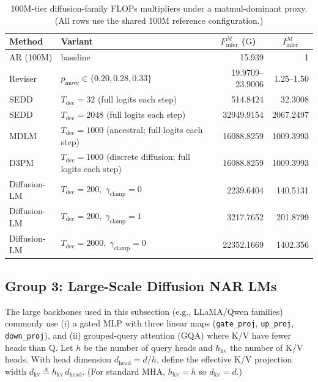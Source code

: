 \documentclass[11pt]{article}
\newcommand{\G}{\mathrm{G}} %
\begin{document}
\begin{table}[t]
\centering
\small
\setlength{\tabcolsep}{4pt}
\begin{tabular}{llrr}
\toprule
Method & Variant
& \multicolumn{1}{c}{$F_{\text{infer}}^{\mathcal{M}}$ ($\G$)}
& \multicolumn{1}{c}{$I_{\text{infer}}^{\mathcal{M}}$} \\
\midrule
AR (100M) & baseline
& \num{15.939} & 1 \\
\midrule
Reviser & $p_{\text{move}}\in\{0.20,0.28,0.33\}$
& \num{19.9709}--\num{23.9006} & \num{1.25}--\num{1.50} \\
\midrule
SEDD & $T_{\text{dec}}{=}32$ (full logits each step)
& \num{514.8424} & \num{32.3008} \\
SEDD & $T_{\text{dec}}{=}2048$ (full logits each step)
& \num{32949.9154} & \num{2067.2497} \\
\midrule
MDLM & $T_{\text{dec}}{=}1000$ (ancestral; full logits each step)
& \num{16088.8259} & \num{1009.3993} \\
\midrule
D3PM & $T_{\text{dec}}{=}1000$ (discrete diffusion; full logits each step)
& \num{16088.8259} & \num{1009.3993} \\
\midrule
Diffusion-LM & $T_{\text{dec}}{=}200,\;\gamma_{\text{clamp}}{=}0$
& \num{2239.6404} & \num{140.5131} \\
Diffusion-LM & $T_{\text{dec}}{=}200,\;\gamma_{\text{clamp}}{=}1$
& \num{3217.7652} & \num{201.8799} \\
Diffusion-LM & $T_{\text{dec}}{=}2000,\;\gamma_{\text{clamp}}{=}0$
& \num{22352.1669} & \num{1402.356} \\
\bottomrule
\end{tabular}
\caption{100M-tier diffusion-family FLOPs multipliers under a matmul-dominant proxy.
(All rows use the shared 100M reference configuration.)}
\end{table}

\subsection{Group 3: Large-Scale Diffusion NAR LMs}


The large backbones used in this subsection (e.g., LLaMA/Qwen families) commonly use
(i) a gated MLP with three linear maps (\texttt{gate\_proj}, \texttt{up\_proj}, \texttt{down\_proj}),
and (ii) grouped-query attention (GQA) where K/V have fewer heads than Q.
Let $h$ be the number of query heads and $h_{\text{kv}}$ the number of K/V heads.
With head dimension $d_{\text{head}}=d/h$, define the effective K/V projection width
$d_{\text{kv}} \triangleq h_{\text{kv}}\,d_{\text{head}}$.
(For standard MHA, $h_{\text{kv}}=h$ so $d_{\text{kv}}=d$.)
\end{document}
